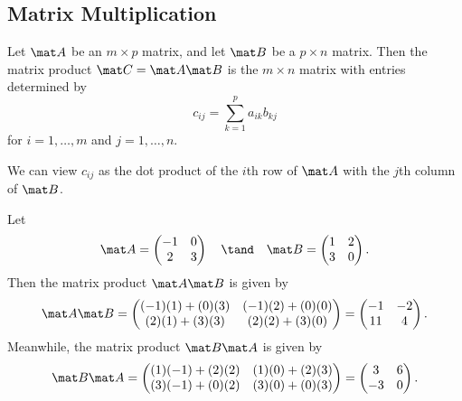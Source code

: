 \subsection{Matrix Multiplication}

\begin{definition}
    Let $\mat A$ be an $m \times p$ matrix, and let $\mat B$ be a $p \times n$ matrix. Then the matrix product $\mat C = \mat A \mat B$ is the $m \times n$ matrix with entries determined by \[c_{ij} = \sum_{k = 1}^p a_{ik} b_{kj}\] for $i = 1, \dots, m$ and $j = 1, \dots, n$.
\end{definition}

We can view $c_{ij}$ as the dot product of the $i$th row of $\mat A$ with the $j$th column of $\mat B$.

\begin{example}
    Let \[\mat A = \begin{pmatrix}-1 & 0 \\ 2 & 3\end{pmatrix} \quad \tand \quad \mat B = \begin{pmatrix}1 & 2 \\ 3 & 0\end{pmatrix}.\] Then the matrix product $\mat A \mat B$ is given by \[\mat A \mat B = \begin{pmatrix}(-1)(1) + (0)(3) & (-1)(2) + (0)(0) \\ (2)(1) + (3)(3) & (2)(2) + (3)(0)\end{pmatrix} = \begin{pmatrix}-1 & -2 \\ 11 & 4\end{pmatrix}.\] Meanwhile, the matrix product $\mat B \mat A$ is given by \[\mat B \mat A = \begin{pmatrix}(1)(-1) + (2)(2) & (1)(0) + (2)(3) \\ (3)(-1) + (0)(2) & (3)(0) + (0)(3)\end{pmatrix} = \begin{pmatrix}3 & 6 \\ -3 & 0\end{pmatrix}.\]
\end{example}


